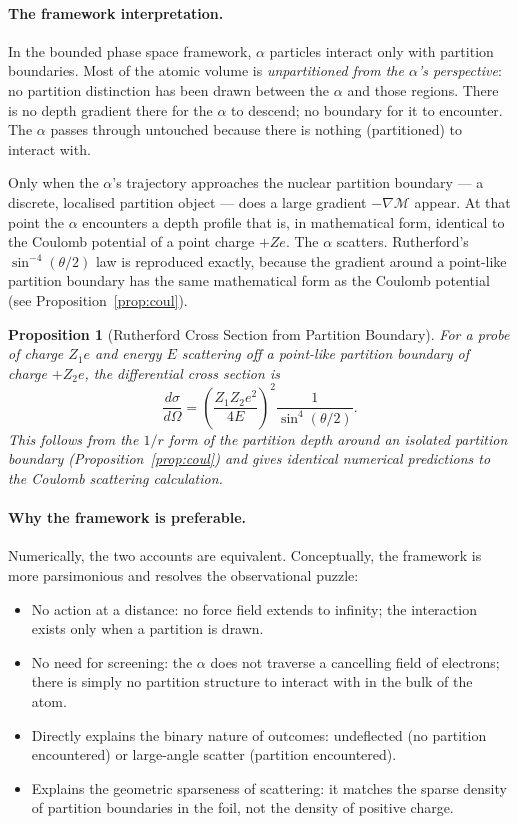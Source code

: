 \documentclass[11pt,a4paper]{article}
\newtheorem{proposition}[theorem]{Proposition}
\theoremstyle{definition}
\theoremstyle{remark}
\newcommand{\Depth}{\mathcal{M}}
\begin{document}
\paragraph{The framework interpretation.} In the bounded phase space framework, $\alpha$ particles interact only with partition boundaries. Most of the atomic volume is \emph{unpartitioned from the $\alpha$'s perspective}: no partition distinction has been drawn between the $\alpha$ and those regions. There is no depth gradient there for the $\alpha$ to descend; no boundary for it to encounter. The $\alpha$ passes through untouched because there is nothing (partitioned) to interact with.

Only when the $\alpha$'s trajectory approaches the nuclear partition boundary --- a discrete, localised partition object --- does a large gradient $-\nabla \Depth$ appear. At that point the $\alpha$ encounters a depth profile that is, in mathematical form, identical to the Coulomb potential of a point charge $+Ze$. The $\alpha$ scatters. Rutherford's $\sin^{-4}(\theta/2)$ law is reproduced exactly, because the gradient around a point-like partition boundary has the same mathematical form as the Coulomb potential (see Proposition~\ref{prop:coul}).

\begin{proposition}[Rutherford Cross Section from Partition Boundary]
\label{prop:rutherford}
For a probe of charge $Z_1 e$ and energy $E$ scattering off a point-like partition boundary of charge $+Z_2 e$, the differential cross section is
\[
\frac{d\sigma}{d\Omega} = \left(\frac{Z_1 Z_2 e^2}{4 E}\right)^2 \frac{1}{\sin^4(\theta/2)}.
\]
This follows from the $1/r$ form of the partition depth around an isolated partition boundary (Proposition~\ref{prop:coul}) and gives \emph{identical} numerical predictions to the Coulomb scattering calculation.
\end{proposition}

\paragraph{Why the framework is preferable.} Numerically, the two accounts are equivalent. Conceptually, the framework is more parsimonious and resolves the observational puzzle:

\begin{itemize}[leftmargin=2em,itemsep=2pt]
\item No action at a distance: no force field extends to infinity; the interaction exists only when a partition is drawn.
\item No need for screening: the $\alpha$ does not traverse a cancelling field of electrons; there is simply no partition structure to interact with in the bulk of the atom.
\item Directly explains the binary nature of outcomes: undeflected (no partition encountered) or large-angle scatter (partition encountered).
\item Explains the geometric sparseness of scattering: it matches the sparse density of partition boundaries in the foil, not the density of positive charge.
\end{itemize}
\end{document}
